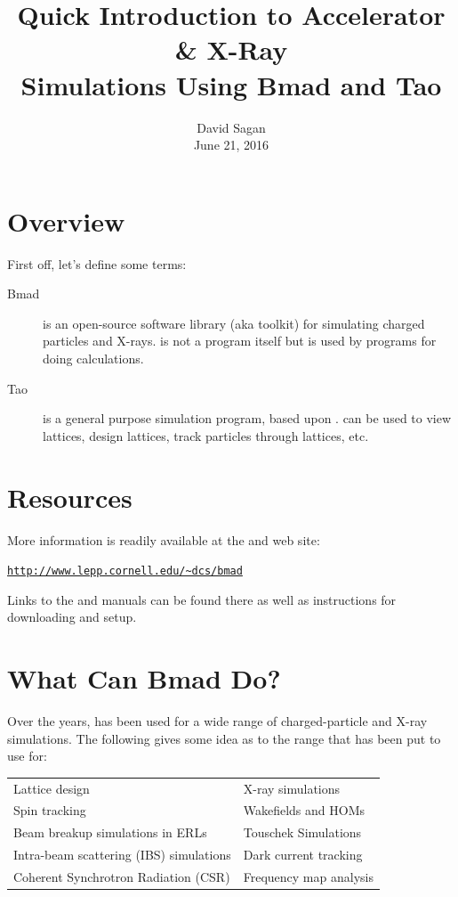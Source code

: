 \documentclass{hitec}
\title{Quick Introduction to Accelerator \& X-Ray \\ Simulations Using Bmad and Tao}
\author{}
\date{David Sagan \\ June 21, 2016}
\begin{document}
\maketitle

\section{Overview}

First off, let's define some terms:
  \begin{description}
  \item[Bmad] \Newline
\bmad is an open-source software library (aka toolkit) for simulating charged particles
and X-rays. \bmad is not a program itself but is used by programs for doing
calculations. 
  \item[Tao] \Newline
\tao is a general purpose simulation program, based upon \bmad. \tao can be used to
view lattices, design lattices, track particles through lattices, etc.
  \end{description}

\section{Resources}

More information is readily available at the \bmad and \tao web site:
\begin{alltt}
  \url{http://www.lepp.cornell.edu/~dcs/bmad}
\end{alltt}
Links to the \bmad and \tao manuals can be found there as well as instructions for
downloading and setup.

\section{What Can Bmad Do?}

Over the years, \bmad has been used for a wide range of charged-particle and X-ray
simulations. The following gives some idea as to the range that \bmad has been put to use
for: 
  {
\centering
\begin{tabular}{ll}
  Lattice design                          & X-ray simulations          \\
  Spin tracking                           & Wakefields and HOMs        \\
  Beam breakup simulations in ERLs        & Touschek Simulations       \\
  Intra-beam scattering (IBS) simulations & Dark current tracking      \\
  Coherent Synchrotron Radiation (CSR)    & Frequency map analysis     \\
\end{tabular}
  }
\end{document}
